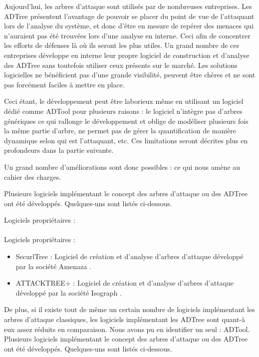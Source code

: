     
    Aujourd'hui, les arbres d'attaque sont utilisés par de nombreuses entreprises. Les ADTree présentent l'avantage de pouvoir se placer du point de vue de l'attaquant lors de l'analyse du système, et donc d'être en mesure de repérer des menaces qui n'auraient pas été trouvées lors d'une analyse en interne. Ceci afin de concentrer les efforts de défenses là où ils seront les plus utiles. Un grand nombre de ces entreprises développe en interne leur propre logiciel de construction et d'analyse des ADTree sans toutefois utiliser ceux présents sur le marché. Les solutions logicielles ne bénéficient pas d'une grande visibilité, peuvent être chères et ne sont pas forcément faciles à mettre en place. 


        Ceci étant, le développement peut être laborieux même en utilisant un logiciel dédié comme ADTool pour plusieurs raisons : le logiciel n’intègre pas d'arbres génériques ce qui rallonge le développement et oblige de modéliser plusieurs fois la même partie d'arbre, ne permet pas de gérer la quantification de manière dynamique selon qui est l'attaquant, etc. Ces limitations seront décrites plus en profondeurs dans la partie suivante.

        Un grand nombre d'améliorations sont donc possibles : ce qui nous amène au cahier des charges.


        Plusieurs logiciels implémentant le concept des arbres d'attaque ou des ADTree ont été développés. Quelques-uns sont listés ci-dessous.
        
        Logiciels propriétaires :

	\paragraph{}

Logiciels propriétaires :

        \begin{itemize}
            \item SecurlTree : Logiciel de création et d'analyse d'arbres d'attaque développé par la société Amenaza \cite{SecurlTree}.
            \item ATTACKTREE+ : Logiciel de création et d'analyse d'arbres d'attaque développé par la société Isograph \cite{ATTACKTREE+}.
        \end{itemize}

De plus, si il existe tout de même un certain nombre de logiciels implémentant les arbres d'attaque classiques, les logiciels implémentant les ADTree sont quant-à eux assez réduits en comparaison. Nous avons pu en identifier un seul : ADTool. 
		Plusieurs logiciels implémentant le concept des arbres d'attaque ou des ADTree ont été développés. Quelques-uns sont listés ci-dessous.
        
